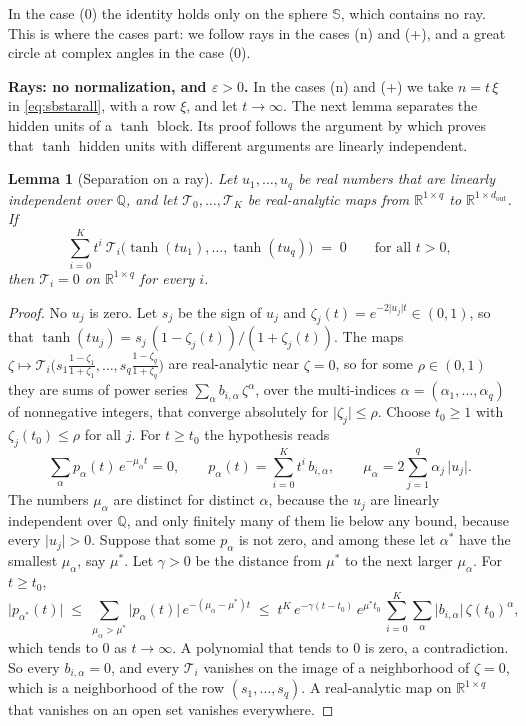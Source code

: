 \documentclass[10pt]{article}
\newtheorem{lemma}[theorem]{Lemma}
\theoremstyle{definition}
\theoremstyle{remark}
\newcommand{\R}{\mathbb{R}}
\newcommand{\para}[1]{\smallskip\noindent\textbf{#1}\hspace{0.5em}}
\begin{document}
In the case (0) the identity holds only on the sphere $\mathbb S$, which contains no ray. This is where the cases part: we follow rays in the cases (n) and (+), and a great circle at complex angles in the case (0).

\para{Rays: no normalization, and $\varepsilon > 0$.} In the cases (n) and (+) we take $n = t\,\xi$ in \eqref{eq:sbstarall}, with a row $\xi$, and let $t \to \infty$. The next lemma separates the hidden units of a $\tanh$ block. Its proof follows the argument by which \citet[Lemma~3.1]{sussmann1992} proves that $\tanh$ hidden units with different arguments are linearly independent.

\begin{lemma}[Separation on a ray]\label{lem:raysep}
Let $u_1, \dots, u_q$ be real numbers that are linearly independent over $\mathbb Q$, and let $\mathcal T_0, \dots, \mathcal T_K$ be real-analytic maps from $\R^{1\times q}$ to $\R^{1\times d_{\mathrm{out}}}$. If
\[
\sum_{i=0}^{K} t^i\ \mathcal T_i\big(\tanh(tu_1), \dots, \tanh(tu_q)\big) \;=\; 0 \qquad\text{for all } t > 0,
\]
then $\mathcal T_i = 0$ on $\R^{1\times q}$ for every $i$.
\end{lemma}

\begin{proof}
No $u_j$ is zero. Let $s_j$ be the sign of $u_j$ and $\zeta_j(t) = e^{-2\lvert u_j\rvert t} \in (0, 1)$, so that $\tanh(tu_j) = s_j\,(1 - \zeta_j(t))/(1 + \zeta_j(t))$. The maps $\zeta \mapsto \mathcal T_i\big(s_1\frac{1 - \zeta_1}{1 + \zeta_1}, \dots, s_q\frac{1 - \zeta_q}{1 + \zeta_q}\big)$ are real-analytic near $\zeta = 0$, so for some $\rho \in (0, 1)$ they are sums of power series $\sum_\alpha b_{i,\alpha}\,\zeta^\alpha$, over the multi-indices $\alpha = (\alpha_1, \dots, \alpha_q)$ of nonnegative integers, that converge absolutely for $\lvert\zeta_j\rvert \le \rho$. Choose $t_0 \ge 1$ with $\zeta_j(t_0) \le \rho$ for all $j$. For $t \ge t_0$ the hypothesis reads
\[
\sum_\alpha p_\alpha(t)\,e^{-\mu_\alpha t} = 0, \qquad p_\alpha(t) = \sum_{i=0}^{K} t^i\,b_{i,\alpha}, \qquad \mu_\alpha = 2\sum_{j=1}^{q}\alpha_j\,\lvert u_j\rvert .
\]
The numbers $\mu_\alpha$ are distinct for distinct $\alpha$, because the $u_j$ are linearly independent over $\mathbb Q$, and only finitely many of them lie below any bound, because every $\lvert u_j\rvert > 0$. Suppose that some $p_\alpha$ is not zero, and among these let $\alpha^*$ have the smallest $\mu_\alpha$, say $\mu^*$. Let $\gamma > 0$ be the distance from $\mu^*$ to the next larger $\mu_\alpha$. For $t \ge t_0$,
\[
\lvert p_{\alpha^*}(t)\rvert \;\le\; \sum_{\mu_\alpha > \mu^*}\lvert p_\alpha(t)\rvert\,e^{-(\mu_\alpha - \mu^*)t}
\;\le\; t^K\,e^{-\gamma(t - t_0)}\,e^{\mu^*t_0}\,\sum_{i=0}^{K}\sum_\alpha\lvert b_{i,\alpha}\rvert\,\zeta(t_0)^\alpha ,
\]
which tends to $0$ as $t \to \infty$. A polynomial that tends to $0$ is zero, a contradiction. So every $b_{i,\alpha} = 0$, and every $\mathcal T_i$ vanishes on the image of a neighborhood of $\zeta = 0$, which is a neighborhood of the row $(s_1, \dots, s_q)$. A real-analytic map on $\R^{1\times q}$ that vanishes on an open set vanishes everywhere.
\end{proof}
\end{document}
